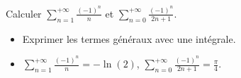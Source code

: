 \begin{exercice}
    Calculer $\displaystyle \sum_{n=1}^{+\infty} \frac{(-1)^n}{n}$ et $\displaystyle \sum_{n=0}^{+\infty} \frac{(-1)^n}{2n+1}$.
\end{exercice}

\begin{elem_sol}
    \begin{itemize}
        \item Exprimer les termes généraux avec une intégrale. 
        \item $\displaystyle \sum_{n=1}^{+\infty} \frac{(-1)^n}{n} = -\ln(2)$, $\displaystyle \sum_{n=0}^{+\infty} \frac{(-1)^n}{2n+1}= \frac{\pi}{4}$.
    \end{itemize}
\end{elem_sol}
